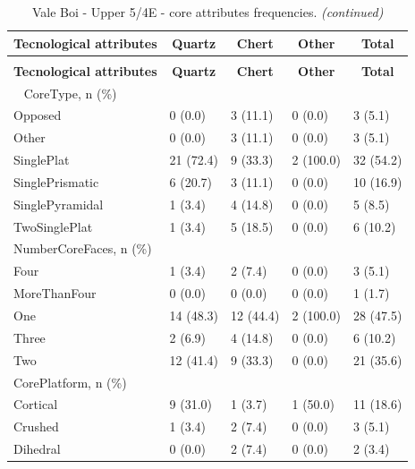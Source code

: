 \documentclass[12pt,twoside]{reedthesis}
\begin{document}
\newpage

\begingroup\fontsize{9}{11}\selectfont
\begin{longtable}[t]{lllll}
\caption{\label{tab:coreattributesVB2}Vale Boi - Upper 5/4E - core attributes frequencies.}\\
\toprule
\multicolumn{1}{c}{\textbf{Tecnological attributes}} & \multicolumn{1}{c}{\textbf{Quartz}} & \multicolumn{1}{c}{\textbf{Chert}} & \multicolumn{1}{c}{\textbf{Other}} & \multicolumn{1}{c}{\textbf{Total}}\\
\midrule
\endfirsthead
\caption[]{\label{tab:coreattributesVB2}Vale Boi - Upper 5/4E - core attributes frequencies. \textit{(continued)}}\\
\toprule
\multicolumn{1}{c}{\textbf{Tecnological attributes}} & \multicolumn{1}{c}{\textbf{Quartz}} & \multicolumn{1}{c}{\textbf{Chert}} & \multicolumn{1}{c}{\textbf{Other}} & \multicolumn{1}{c}{\textbf{Total}}\\
\midrule
\endhead
\
\endfoot
\bottomrule
\endlastfoot
CoreType, n (\%) &  &  &  & \\
Opposed & 0 (0.0) & 3 (11.1) & 0 (0.0) & 3 (5.1)\\
Other & 0 (0.0) & 3 (11.1) & 0 (0.0) & 3 (5.1)\\
SinglePlat & 21 (72.4) & 9 (33.3) & 2 (100.0) & 32 (54.2)\\
SinglePrismatic & 6 (20.7) & 3 (11.1) & 0 (0.0) & 10 (16.9)\\
\addlinespace
SinglePyramidal & 1 (3.4) & 4 (14.8) & 0 (0.0) & 5 (8.5)\\
TwoSinglePlat & 1 (3.4) & 5 (18.5) & 0 (0.0) & 6 (10.2)\\
NumberCoreFaces, n (\%) &  &  &  & \\
Four & 1 (3.4) & 2 (7.4) & 0 (0.0) & 3 (5.1)\\
MoreThanFour & 0 (0.0) & 0 (0.0) & 0 (0.0) & 1 (1.7)\\
\addlinespace
One & 14 (48.3) & 12 (44.4) & 2 (100.0) & 28 (47.5)\\
Three & 2 (6.9) & 4 (14.8) & 0 (0.0) & 6 (10.2)\\
Two & 12 (41.4) & 9 (33.3) & 0 (0.0) & 21 (35.6)\\
CorePlatform, n (\%) &  &  &  & \\
Cortical & 9 (31.0) & 1 (3.7) & 1 (50.0) & 11 (18.6)\\
\addlinespace
Crushed & 1 (3.4) & 2 (7.4) & 0 (0.0) & 3 (5.1)\\
Dihedral & 0 (0.0) & 2 (7.4) & 0 (0.0) & 2 (3.4)\\

\end{longtable}
\end{document}
